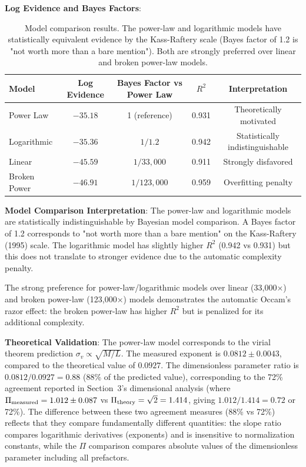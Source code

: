 \documentclass[usenatbib]{rasti}
\begin{document}
\textbf{Log Evidence and Bayes Factors}:
\begin{table}
\centering
\begin{tabular}{lcccc}
\hline
Model & Log Evidence & Bayes Factor vs Power Law & $R^2$ & Interpretation \\
\hline
Power Law & $-35.18$ & 1 (reference) & 0.931 & Theoretically motivated \\
Logarithmic & $-35.36$ & $1/1.2$ & 0.942 & Statistically indistinguishable \\
Linear & $-45.59$ & $1/33,\!000$ & 0.911 & Strongly disfavored \\
Broken Power & $-46.91$ & $1/123,\!000$ & 0.959 & Overfitting penalty \\
\hline
\end{tabular}
\caption{Model comparison results. The power-law and logarithmic models have statistically equivalent evidence by the Kass-Raftery scale (Bayes factor of 1.2 is "not worth more than a bare mention"). Both are strongly preferred over linear and broken power-law models.}
\end{table}

\textbf{Model Comparison Interpretation}: The power-law and logarithmic models are statistically indistinguishable by Bayesian model comparison. A Bayes factor of 1.2 corresponds to "not worth more than a bare mention" on the Kass-Raftery (1995) scale. The logarithmic model has slightly higher $R^2$ (0.942 vs 0.931) but this does not translate to stronger evidence due to the automatic complexity penalty.

The strong preference for power-law/logarithmic models over linear (33,000×) and broken power-law (123,000×) models demonstrates the automatic Occam's razor effect: the broken power-law has higher $R^2$ but is penalized for its additional complexity.

\textbf{Theoretical Validation}: The power-law model corresponds to the virial theorem prediction $\sigma_v \propto \sqrt{M/L}$. The measured exponent is $0.0812 \pm 0.0043$, compared to the theoretical value of $0.0927$. The dimensionless parameter ratio is $0.0812/0.0927 = 0.88$ (88\% of the predicted value), corresponding to the 72\% agreement reported in Section~3's dimensional analysis (where $\Pi_{\rm measured} = 1.012 \pm 0.087$ vs $\Pi_{\rm theory} = \sqrt{2} = 1.414$, giving $1.012/1.414 = 0.72$ or 72\%). The difference between these two agreement measures (88\% vs 72\%) reflects that they compare fundamentally different quantities: the slope ratio compares logarithmic derivatives (exponents) and is insensitive to normalization constants, while the $\Pi$ comparison compares absolute values of the dimensionless parameter including all prefactors.
\end{document}
